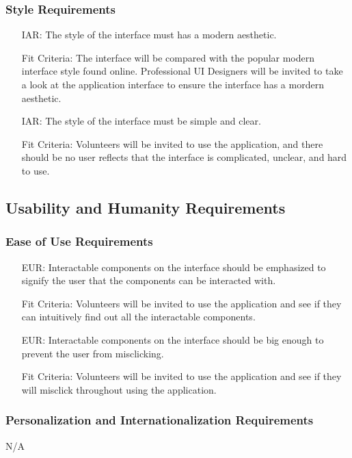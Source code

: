 \documentclass[12pt]{article}
\newcounter{reqnum} %
\newcounter{arreqnum} %
\newcounter{iarreqnum} %
\newcounter{eurreqnum} %
\begin{document}
\subsubsection{Style Requirements}
\begin{itemize}
    \item[IAR\refstepcounter{iarreqnum}\theiarreqnum \label{R_Inputs}:] The style of the interface must has a modern aesthetic.
    \item[] Fit Criteria: The interface will be compared with the popular modern interface style found online. Professional UI Designers will be invited to take a look at the application interface to ensure the interface has a mordern aesthetic.
    \item[IAR\refstepcounter{iarreqnum}\theiarreqnum \label{R_Inputs}:] The style of the interface must be simple and clear. 
    \item[] Fit Criteria: Volunteers will be invited to use the application, and there should be no user reflects that the interface is complicated, unclear, and hard to use.
\end{itemize}
\subsection{Usability and Humanity Requirements}

\subsubsection{Ease of Use Requirements}
\begin{itemize}
    \item[EUR\refstepcounter{eurreqnum}\theeurreqnum \label{R_Inputs}:] Interactable components on the interface should be emphasized to signify the user that the components can be interacted with.
    \item[] Fit Criteria: Volunteers will be invited to use the application and see if they can intuitively find out all the interactable components.
    \item[EUR\refstepcounter{eurreqnum}\theeurreqnum \label{R_Inputs}:] Interactable components on the interface should be big enough to prevent the user from misclicking.
    \item[] Fit Criteria: Volunteers will be invited to use the application and see if they will misclick throughout using the application.
\end{itemize}

\subsubsection{Personalization and Internationalization Requirements}
N/A
\end{document}
